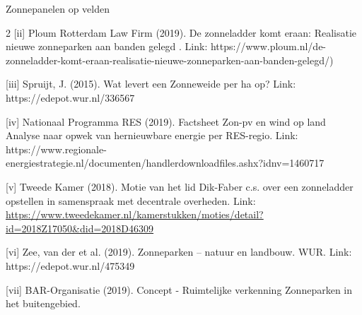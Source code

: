 \begin{voorstel}{Zonnepanelen op velden}
\begin{multicols}{2}
[ii] Ploum Rotterdam Law Firm (2019). De zonneladder komt eraan: Realisatie nieuwe zonneparken aan banden gelegd . Link: https://www.ploum.nl/de-zonneladder-komt-eraan-realisatie-nieuwe-zonneparken-aan-banden-gelegd/)

[iii] Spruijt, J. (2015). Wat levert een Zonneweide per ha op? Link: https://edepot.wur.nl/336567

[iv] Nationaal Programma RES (2019). Factsheet Zon-pv en wind op land Analyse naar opwek van hernieuwbare energie per RES-regio. Link: https://www.regionale-energiestrategie.nl/documenten/handlerdownloadfiles.ashx?idnv=1460717

[v] Tweede Kamer (2018). Motie van het lid Dik-Faber c.s. over een zonneladder opstellen in samenspraak met decentrale overheden. Link: \url{https://www.tweedekamer.nl/kamerstukken/moties/detail?id=2018Z17050&did=2018D46309}

[vi] Zee, van der et al. (2019). Zonneparken – natuur en landbouw. WUR. Link: https://edepot.wur.nl/475349

[vii] BAR-Organisatie (2019). Concept - Ruimtelijke verkenning Zonneparken in het buitengebied.

\end{multicols}

\end{voorstel}


